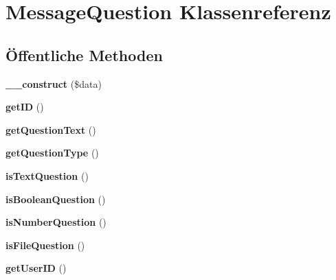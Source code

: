 \hypertarget{class_message_question}{}\section{Message\+Question Klassenreferenz}
\label{class_message_question}
\subsection*{Öffentliche Methoden}
\begin{DoxyCompactItemize}
\item 
\mbox{\label{class_message_question_a111fcb418a1afb0e65bedab55e0747fa}} 
{\bfseries \+\_\+\+\_\+construct} (\$data)
\item 
\mbox{\label{class_message_question_a4d7ccc6b94842c23b3755ef328073de3}} 
{\bfseries get\+ID} ()
\item 
\mbox{\label{class_message_question_a33438b9794331419f7d21adc52c602dc}} 
{\bfseries get\+Question\+Text} ()
\item 
\mbox{\label{class_message_question_a50667180ef049ab182a11371e00ef65b}} 
{\bfseries get\+Question\+Type} ()
\item 
\mbox{\label{class_message_question_a7813ff6a37e40ca178ef946859722bf6}} 
{\bfseries is\+Text\+Question} ()
\item 
\mbox{\label{class_message_question_a6f45852eaa829924e36fae458ec7acbd}} 
{\bfseries is\+Boolean\+Question} ()
\item 
\mbox{\label{class_message_question_a49d6e6d0e71f14240fd54f19b799115f}} 
{\bfseries is\+Number\+Question} ()
\item 
\mbox{\label{class_message_question_a613280c4c8c586255eb677a677838ed1}} 
{\bfseries is\+File\+Question} ()
\item 
\mbox{\label{class_message_question_a47608fc83bea05c489a77189d34e0c4c}} 
{\bfseries get\+User\+ID} ()
\item 

\end{DoxyCompactItemize}
